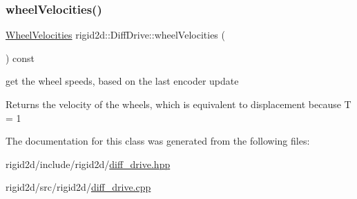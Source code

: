 \subsubsection{\texorpdfstring{wheel\+Velocities()}{wheelVelocities()}}
{\footnotesize\ttfamily \hyperlink{structrigid2d_1_1WheelVelocities}{Wheel\+Velocities} rigid2d\+::\+Diff\+Drive\+::wheel\+Velocities (\begin{DoxyParamCaption}{ }\end{DoxyParamCaption}) const}



get the wheel speeds, based on the last encoder update 

\begin{DoxyReturn}{Returns}
the velocity of the wheels, which is equivalent to displacement because  T = 1 
\end{DoxyReturn}


The documentation for this class was generated from the following files\+:\begin{DoxyCompactItemize}
\item 
rigid2d/include/rigid2d/\hyperlink{diff__drive_8hpp}{diff\+\_\+drive.\+hpp}\item 
rigid2d/src/rigid2d/\hyperlink{diff__drive_8cpp}{diff\+\_\+drive.\+cpp}\end{DoxyCompactItemize}
